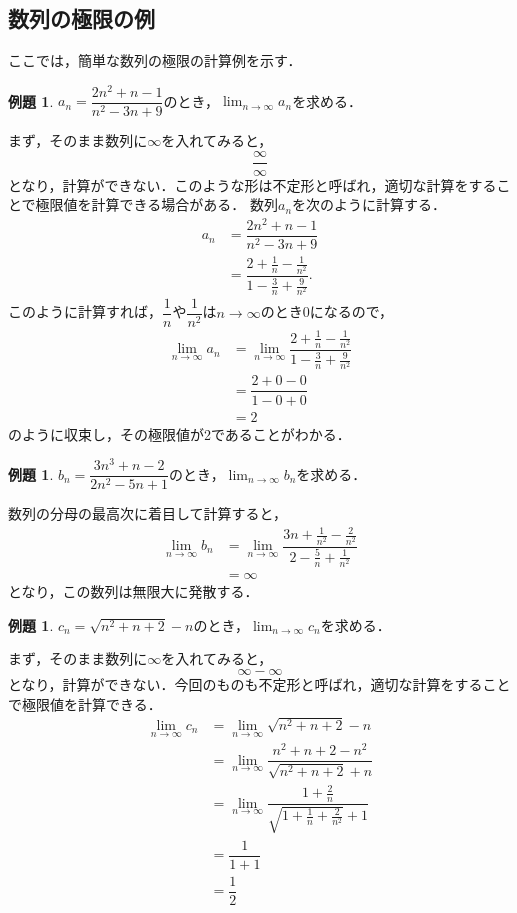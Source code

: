 \documentclass[a4paper,12pt,autodetect-engine,dvipdfmx]{jsarticle}
\theoremstyle{definition}
\newtheorem{exa}[dfn]{例題}
\begin{document}
\subsection{数列の極限の例}
ここでは，簡単な数列の極限の計算例を示す．
\begin{exa}
    $a_{n} = \dfrac{2n^2 + n - 1}{n^2 - 3n +9}$のとき，$\displaystyle \lim_{n \to \infty}a_{n}$を求める．
\end{exa}
まず，そのまま数列に$\infty$を入れてみると，
$$\dfrac{\infty}{\infty}$$
となり，計算ができない．このような形は不定形と呼ばれ，適切な計算をすることで極限値を計算できる場合がある．
数列$a_{n}$を次のように計算する．
\begin{align*}
    a_{n} &= \dfrac{2n^2 + n - 1}{n^2 - 3n +9}\\
          &= \dfrac{2 + \frac{1}{n} - \frac{1}{n^2}}{1 - \frac{3}{n} + \frac{9}{n^2}}.
\end{align*}
このように計算すれば，$\dfrac{1}{n}$や$\dfrac{1}{n^2}$は$n \to \infty$のとき0になるので，
\begin{align*}
    \lim_{n \to \infty}a_{n} &= \lim_{n \to \infty}\dfrac{2 + \frac{1}{n} - \frac{1}{n^2}}{1 - \frac{3}{n} + \frac{9}{n^2}}\\
                             &= \dfrac{2 + 0 - 0}{1 - 0 + 0}\\
                             &= 2
\end{align*}
のように収束し，その極限値が2であることがわかる．
\begin{exa}
    $b_{n} = \dfrac{3n^3 + n - 2}{2n^2 - 5n +1}$のとき，$\displaystyle \lim_{n \to \infty}b_{n}$を求める．
\end{exa}
数列の分母の最高次に着目して計算すると，
\begin{align*}
    \lim_{n \to \infty}b_{n} &= \lim_{n \to \infty}\dfrac{3n + \frac{1}{n^2} - \frac{2}{n^2}}{2 - \frac{5}{n} + \frac{1}{n^2}}\\
                             &= \infty
\end{align*}
となり，この数列は無限大に発散する．
\begin{exa}
    $c_{n} = \sqrt{n^2 + n + 2} - n$のとき，$\displaystyle \lim_{n \to \infty}c_{n}$を求める．
\end{exa}
まず，そのまま数列に$\infty$を入れてみると，
$$\infty - \infty$$
となり，計算ができない．今回のものも不定形と呼ばれ，適切な計算をすることで極限値を計算できる．
\begin{align*}
    \lim_{n \to \infty}c_{n} &= \lim_{n \to \infty}\sqrt{n^2 + n + 2} - n\\
          &= \lim_{n \to \infty}\dfrac{n^2 + n + 2 - n^2}{\sqrt{n^2 + n + 2} + n}\\
          &= \lim_{n \to \infty}\dfrac{1 + \frac{2}{n}}{\sqrt{1 + \frac{1}{n} + \frac{2}{n^2}} + 1}\\
          &= \dfrac{1}{1 + 1}\\
          &= \dfrac{1}{2}
\end{align*}
\end{document}
